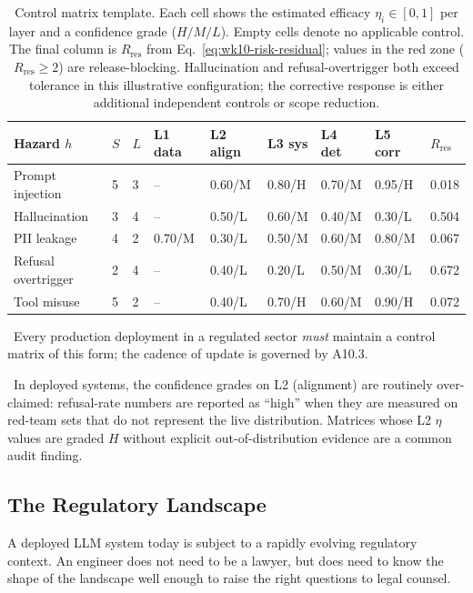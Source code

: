 \begin{table}[H]
\centering
\footnotesize
\begin{tabular}{L{2.2cm} C{1.1cm} C{1.1cm} C{1.1cm} C{1.1cm} C{1.1cm} C{1.1cm} C{1.1cm} C{1.3cm}}
\toprule
\textbf{Hazard $h$} & \textbf{$S$} & \textbf{$L$}
  & \textbf{L1 data} & \textbf{L2 align} & \textbf{L3 sys}
  & \textbf{L4 det} & \textbf{L5 corr} & \textbf{$R_\mathrm{res}$} \\
\midrule
Prompt injection    & 5 & 3 & --
  & 0.60/M & 0.80/H & 0.70/M & 0.95/H & 0.018 \\
Hallucination       & 3 & 4 & --
  & 0.50/L & 0.60/M & 0.40/M & 0.30/L & 0.504 \\
PII leakage         & 4 & 2 & 0.70/M
  & 0.30/L & 0.50/M & 0.60/M & 0.80/M & 0.067 \\
Refusal overtrigger & 2 & 4 & --
  & 0.40/L & 0.20/L & 0.50/M & 0.30/L & 0.672 \\
Tool misuse         & 5 & 2 & --
  & 0.40/L & 0.70/H & 0.60/M & 0.90/H & 0.072 \\
\bottomrule
\end{tabular}
\caption{Control matrix template. Each cell shows the estimated
efficacy $\eta_i \in [0, 1]$ per layer and a confidence grade
($H/M/L$). Empty cells denote no applicable control. The final
column is $R_\mathrm{res}$ from
Eq.~\eqref{eq:wk10-risk-residual}; values in the red zone
($R_\mathrm{res} \ge 2$) are release-blocking. Hallucination and
refusal-overtrigger both exceed tolerance in this illustrative
configuration; the corrective response is either additional
independent controls or scope reduction.}
\label{tab:wk10_control_matrix}
\end{table}

\Norm\ Every production deployment in a regulated sector
\emph{must} maintain a control matrix of this form; the cadence
of update is governed by A10.3.

\Find\ In deployed systems, the confidence grades on L2 (alignment)
are routinely over-claimed: refusal-rate numbers are reported as
``high'' when they are measured on red-team sets that do not
represent the live distribution. Matrices whose L2 $\eta$ values
are graded $H$ without explicit out-of-distribution evidence are a
common audit finding.

\subsection{The Regulatory Landscape}

A deployed LLM system today is subject to a rapidly evolving
regulatory context. An engineer does not need to be a lawyer, but
does need to know the shape of the landscape well enough to raise
the right questions to legal counsel.


